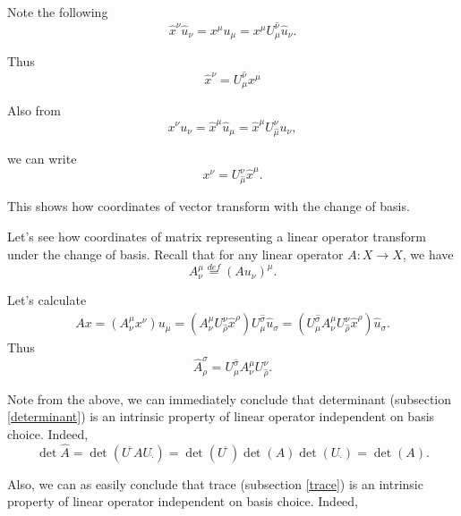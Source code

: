 \documentclass[main.tex]{subfiles}
\begin{document}
Note the following
\begin{equation}
\hat{x}^\nu \hat{u}_\nu = x^\mu u_\mu = x^\mu U^{\hat{\nu}}_\mu  \hat{u}_\nu.
\end{equation}

Thus
\begin{equation}
\hat{x}^\nu = U^{\hat{\nu}}_\mu x^\mu 
\end{equation}

Also from
\begin{equation}
x^\nu u_\nu = \hat{x}^\mu \hat{u}_\mu = \hat{x}^\mu U^\nu_{\hat{\mu}} u_\nu,
\end{equation}

we can write
\begin{equation}
x^\nu =   U^\nu_{\hat{\mu}} \hat{x}^\mu.
\end{equation}

This shows how coordinates of vector transform with the change of basis.

Let's see how coordinates of matrix representing a linear operator transform under the change of basis. Recall that for any linear operator $A: X \to X$, we have
\begin{equation}
A^\mu_\nu \stackrel{def}{=}(Au_\nu)^\mu.
\end{equation}

Let's calculate
\begin{align*}
Ax = (A^\mu_\nu x^\nu)u_\mu = (A^\mu_\nu U^\nu_{\hat{\rho}} \hat{x}^\rho) U^{\hat{\sigma}}_\mu  \hat{u}_\sigma = (U^{\hat{\sigma}}_\mu A^\mu_\nu U^\nu_{\hat{\rho}} \hat{x}^\rho) \hat{u}_\sigma.
\end{align*}
Thus
\begin{equation}
\label{matrix-under-change-of-coordinates}
\hat{A}^\sigma_\rho = U^{\hat{\sigma}}_\mu A^\mu_\nu U^\nu_{\hat{\rho}}.
\end{equation}

Note from the above, we can immediately conclude that determinant (subsection \ref{determinant}) is an intrinsic property of linear operator independent on basis choice. Indeed,
\begin{equation}
\label{invariance-of-determinant}
\det \hat{A} = \det(U^{\hat{\cdot}}A U_{\hat{\cdot}}) = \det(U^{\hat{\cdot}})\det(A) \det(U_{\hat{\cdot}}) = \det(A).
\end{equation}   

Also, we can as easily conclude that trace (subsection \ref{trace}) is an intrinsic property of linear operator independent on basis choice. Indeed,
\end{document}
